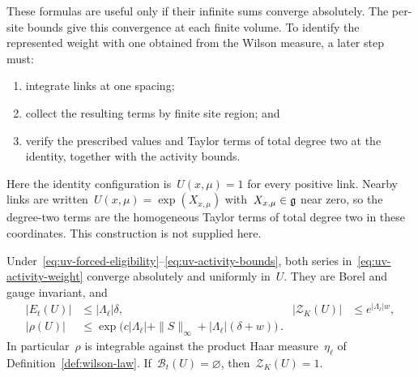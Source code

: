 These formulas are useful only if their infinite sums converge absolutely.
The per-site bounds give this convergence at each finite volume. To identify the represented weight with one obtained from the Wilson measure, a later step must:
\begin{enumerate}
\item integrate links at one spacing;
\item collect the resulting terms by finite site region; and
\item verify the prescribed values and Taylor terms of total degree two at the identity, together with the activity bounds.
\end{enumerate}
Here the identity configuration is~$U(x,\mu)=1$ for every positive link. Nearby links are written~$U(x,\mu)=\exp(X_{x,\mu})$ with~$X_{x,\mu}\in\mathfrak g$ near zero, so the degree-two terms are the homogeneous Taylor terms of total degree two in these coordinates. This construction is not supplied here.

\begin{proposition}\label{prop:uv-activity-sums}
Under~\eqref{eq:uv-forced-eligibility}--\eqref{eq:uv-activity-bounds}, both series in~\eqref{eq:uv-activity-weight} converge absolutely and uniformly in~$U$.
They are Borel and gauge invariant, and
\begin{equation}\label{eq:uv-activity-global-bounds}
 \begin{aligned}
 |E_t(U)|&\le|\Lambda_\ell|\delta,&
 |\mathcal Z_K(U)|&\le e^{|\Lambda_\ell|w},\\
 |\rho(U)|&\le
 \exp\!\bigl(c|\Lambda_\ell|+\|S\|_\infty+|\Lambda_\ell|(\delta+w)\bigr)\,.
 \end{aligned}
\end{equation}
In particular~$\rho$ is integrable against the product Haar measure~$\eta_\ell$ of Definition~\ref{def:wilson-law}.
If~$\mathcal B_t(U)=\varnothing$, then~$\mathcal Z_K(U)=1$.
\end{proposition}

